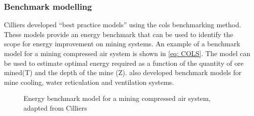 		\subsubsection{Benchmark modelling}
		 Cilliers \cite{Cilliers2015PHD} developed \enquote{best practice models} using the \gls{cols} benchmarking method. These models provide an energy benchmark that can be used to identify the scope for energy improvement on mining systems. An example of a benchmark model for a mining compressed air system is shown in \cref{eq: COLS}. The model can be used to estimate optimal energy required as a function of the quantity of ore mined(T) and the depth of the mine (Z). \cite{Cilliers2015PHD} also developed benchmark models for mine cooling, water reticulation and ventilation systems.
		\begin{figure}[h!]
			\centering
			\fbox{\hspace{2cm}\hspace{2cm}}
			\caption[Energy benchmark model for a mining compressed air system]{Energy benchmark model for a mining compressed air system, adapted from Cilliers \cite{Cilliers2015PHD}}
			\label{fig: 3D Benchmark}
		\end{figure}
